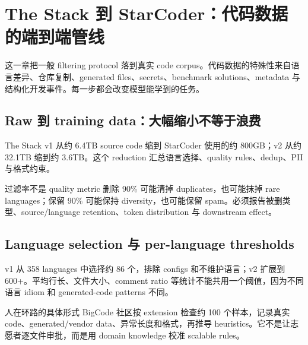 \section{The Stack 到 StarCoder：代码数据的端到端管线}

这一章把一般 filtering protocol 落到真实 code corpus。代码数据的特殊性来自语言差异、仓库复制、generated files、secrets、benchmark solutions、metadata 与结构化开发事件。每一步都会改变模型能学到的任务。

\subsection{Raw 到 training data：大幅缩小不等于浪费}

The Stack v1 从约 6.4TB source code 缩到 StarCoder 使用的约 800GB；v2 从约 32.1TB 缩到约 3.6TB。这个 reduction 汇总语言选择、quality rules、dedup、PII 与格式约束。



\begin{warningbox}{过滤率不是 quality metric}
删除 90\% 可能清掉 duplicates，也可能抹掉 rare languages；保留 90\% 可能保持 diversity，也可能保留 spam。必须报告被删类型、source/language retention、token distribution 与 downstream effect。
\end{warningbox}

\subsection{Language selection 与 per-language thresholds}

v1 从 358 languages 中选择约 86 个，排除 configs 和不维护语言；v2 扩展到 600+。平均行长、文件大小、comment ratio 等统计不能共用一个阈值，因为不同语言 idiom 和 generated-code patterns 不同。


\begin{knowledgebox}{人在环路的具体形式}
BigCode 社区按 extension 检查约 100 个样本，记录真实 code、generated/vendor data、异常长度和格式，再推导 heuristics。它不是让志愿者逐文件审批，而是用 domain knowledge 校准 scalable rules。
\end{knowledgebox}

